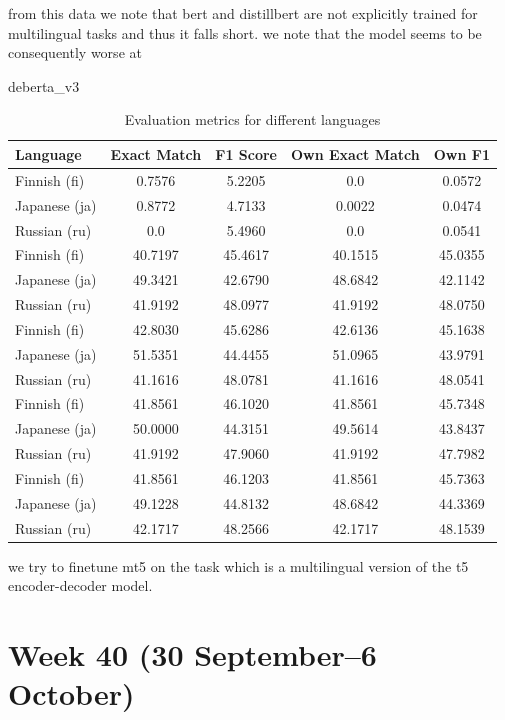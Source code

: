 \documentclass[11pt]{article}
\begin{document}
from this data 
we note that bert and distillbert are not explicitly trained for multilingual tasks and thus it falls short. 
we note that the model seems to be consequently worse at 

deberta\_v3 

\begin{table}[ht]
    \centering
    \begin{tabular}{|l|c|c|c|c|}
        \hline
        Language & Exact Match & F1 Score & Own Exact Match & Own F1 \\
        \hline
        Finnish (fi) & 0.7576 & 5.2205 & 0.0 & 0.0572 \\
        Japanese (ja) & 0.8772 & 4.7133 & 0.0022 & 0.0474 \\
        Russian (ru) & 0.0 & 5.4960 & 0.0 & 0.0541 \\
        \hline
        Finnish (fi) & 40.7197 & 45.4617 & 40.1515 & 45.0355 \\
        Japanese (ja) & 49.3421 & 42.6790 & 48.6842 & 42.1142 \\
        Russian (ru) & 41.9192 & 48.0977 & 41.9192 & 48.0750 \\
        \hline
        Finnish (fi) & 42.8030 & 45.6286 & 42.6136 & 45.1638 \\
        Japanese (ja) & 51.5351 & 44.4455 & 51.0965 & 43.9791 \\
        Russian (ru) & 41.1616 & 48.0781 & 41.1616 & 48.0541 \\
        \hline
        Finnish (fi) & 41.8561 & 46.1020 & 41.8561 & 45.7348 \\
        Japanese (ja) & 50.0000 & 44.3151 & 49.5614 & 43.8437 \\
        Russian (ru) & 41.9192 & 47.9060 & 41.9192 & 47.7982 \\
        \hline
        Finnish (fi) & 41.8561 & 46.1203 & 41.8561 & 45.7363 \\
        Japanese (ja) & 49.1228 & 44.8132 & 48.6842 & 44.3369 \\
        Russian (ru) & 42.1717 & 48.2566 & 42.1717 & 48.1539 \\
        \hline
    \end{tabular}
    \caption{Evaluation metrics for different languages}
    \label{tab:evaluation_metrics}
\end{table}

we try to finetune mt5 on the task which is a multilingual version of the t5 encoder-decoder model. 


\section{Week 40 (30 September--6 October)}
\end{document}
